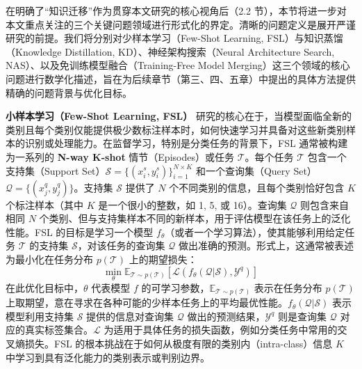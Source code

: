 \documentclass[../main.tex]{subfiles}
\begin{document}

在明确了“知识迁移”作为贯穿本文研究的核心视角后（2.2 节），本节将进一步对本文重点关注的三个关键问题领域进行形式化的界定。清晰的问题定义是展开严谨研究的前提。我们将分别对少样本学习（Few-Shot Learning, FSL）与知识蒸馏（Knowledge Distillation, KD）、神经架构搜索（Neural Architecture Search, NAS）、以及免训练模型融合（Training-Free Model Merging）这三个领域的核心问题进行数学化描述，旨在为后续章节（第三、四、五章）中提出的具体方法提供精确的问题背景与优化目标。


\textbf{小样本学习（Few-Shot Learning, FSL）} 研究的核心在于，当模型面临全新的类别且每个类别仅能提供极少数标注样本时，如何快速学习并具备对这些新类别样本的识别或处理能力。在监督学习，特别是分类任务的背景下，FSL 通常被构建为一系列的 \textbf{N-way K-shot} 情节（Episodes）或任务 $\mathcal{T}$。每个任务 $\mathcal{T}$ 包含一个支持集（Support Set）$\mathcal{S} = \{(x_i^s, y_i^s)\}_{i=1}^{N \times K}$ 和一个查询集（Query Set）$\mathcal{Q} = \{(x_j^q, y_j^q)\}$。支持集 $\mathcal{S}$ 提供了 $N$ 个不同类别的信息，且每个类别恰好包含 $K$ 个标注样本（其中 $K$ 是一个很小的整数，如 1, 5, 或 16）。查询集 $\mathcal{Q}$ 则包含来自相同 $N$ 个类别、但与支持集样本不同的新样本，用于评估模型在该任务上的泛化性能。FSL 的目标是学习一个模型 $f_\theta$（或者一个学习算法），使其能够利用给定任务 $\mathcal{T}$ 的支持集 $\mathcal{S}$，对该任务的查询集 $\mathcal{Q}$ 做出准确的预测。形式上，这通常被表述为最小化在任务分布 $p(\mathcal{T})$ 上的期望损失：
\begin{equation}
	\min_\theta \mathbb{E}_{\mathcal{T} \sim p(\mathcal{T})} \left[ \mathcal{L}\left(f_\theta(\mathcal{Q}|\mathcal{S}), \mathcal{Y}^q\right) \right]
	\label{eq:fsl_objective}
\end{equation}
在此优化目标中，$\theta$ 代表模型 $f$ 的可学习参数，$\mathbb{E}_{\mathcal{T} \sim p(\mathcal{T})}$ 表示在任务分布 $p(\mathcal{T})$ 上取期望，意在寻求在各种可能的少样本任务上的平均最优性能。$f_\theta(\mathcal{Q}|\mathcal{S})$ 表示模型利用支持集 $\mathcal{S}$ 提供的信息对查询集 $\mathcal{Q}$ 做出的预测结果，$\mathcal{Y}^q$ 则是查询集 $\mathcal{Q}$ 对应的真实标签集合。$\mathcal{L}$ 为适用于具体任务的损失函数，例如分类任务中常用的交叉熵损失。FSL 的根本挑战在于如何从极度有限的类别内（intra-class）信息 $K$ 中学习到具有泛化能力的类别表示或判别边界。
\end{document}
